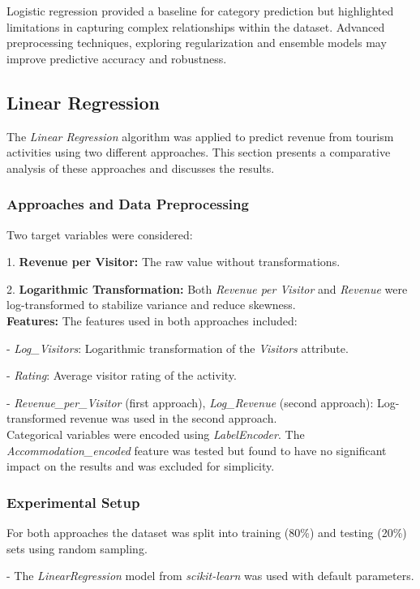 \documentclass{article}
\begin{document}
Logistic regression provided a baseline for category prediction but highlighted limitations in capturing complex relationships within the dataset. Advanced preprocessing techniques, exploring regularization and ensemble models may improve predictive accuracy and robustness.


\subsection{Linear Regression}

The \textit{Linear Regression} algorithm was applied to predict revenue from tourism activities using two different approaches. This section presents a comparative analysis of these approaches and discusses the results.

\subsubsection{Approaches and Data Preprocessing}
Two target variables were considered:

1. \textbf{Revenue per Visitor:} The raw value without transformations.

2. \textbf{Logarithmic Transformation:} Both \textit{Revenue per Visitor} and \textit{Revenue} were log-transformed to stabilize variance and reduce skewness.\\[8pt]
\textbf{Features:}
The features used in both approaches included:

- \textit{Log\_Visitors}: Logarithmic transformation of the \textit{Visitors} attribute.

- \textit{Rating}: Average visitor rating of the activity.

- \textit{Revenue\_per\_Visitor} (first approach), \textit{Log\_Revenue} (second approach): Log-transformed revenue was used in the second approach.\\[6pt]
Categorical variables were encoded using \textit{LabelEncoder}. The \textit{Accommodation\_encoded} feature was tested but found to have no significant impact on the results and was excluded for simplicity.

\subsubsection{Experimental Setup}
For both approaches the dataset was split into training (80\%) and testing (20\%) sets using random sampling.

- The \textit{LinearRegression} model from \textit{scikit-learn} was used with default parameters.
\end{document}
